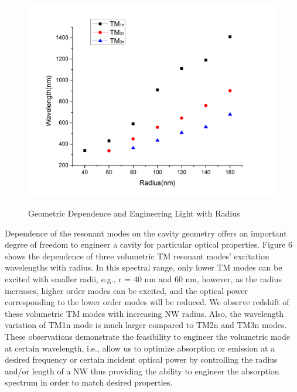 \begin{figure}
  \caption{Geometric Dependence and Engineering Light with Radius}
  \centering
  \includegraphics[width=\textwidth]{pictures/LM/TMRadiusScat}
  \label{TMRadiusScat}
\end{figure}

Dependence of the resonant modes on the cavity geometry offers an important
degree of freedom to engineer a cavity for particular optical properties.
Figure 6 shows the dependence of three volumetric TM resonant modes’ excitation
wavelengths with radius. In this spectral range, only lower TM modes can be
excited with smaller radii, e.g., r = 40 nm and 60 nm, however, as the radius
increases, higher order modes can be excited, and the optical power
corresponding to the lower order modes will be reduced. We observe redshift of
these volumetric TM modes with increasing NW radius. Also, the wavelength
variation of TM1n mode is much larger compared to TM2n and TM3n modes. These
observations demonstrate the feasibility to engineer the volumetric mode at
certain wavelength, i.e., allow us to optimize absorption or emission at a
desired frequency or certain incident optical power  by controlling the radius
and/or length of a NW thus providing the ability to engineer the absorption
spectrum in order to match desired properties.


